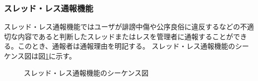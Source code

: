 \documentclass[a4j]{jarticle}
\begin{document}
  \subsubsection{スレッド・レス通報機能}
  スレッド・レス通報機能ではユーザが誹謗中傷や公序良俗に違反するなどの不適切な内容であると判断したスレッドまたはレスを管理者に通報することができる。このとき、通報者は通報理由を明記する。
  スレッド・レス通報機能のシーケンス図は図\ref{fig:bbs_report.png}に示す。
  \begin{figure}[H]
    \centering
    \caption{スレッド・レス通報機能のシーケンス図}
    \label{fig:bbs_report.png}
  \end{figure}
\end{document}
